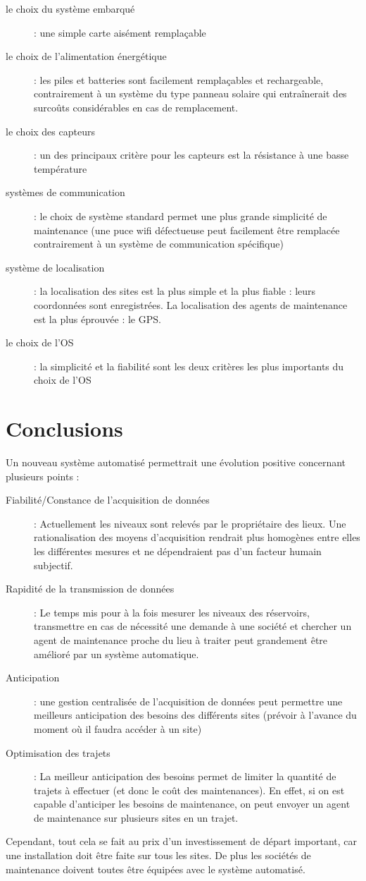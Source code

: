 \documentclass{mise_en_page}
\begin{document}
\begin{description}
\item[le choix du système embarqué] : une simple carte aisément
remplaçable
\item[le choix de l’alimentation énergétique] : les piles et batteries
sont facilement remplaçables et rechargeable, contrairement à un
système du type panneau solaire qui entraînerait des surcoûts
considérables en cas de remplacement.
\item[le choix des capteurs] : un des principaux critère pour les
capteurs est la résistance à une basse température
\item[systèmes de communication] : le choix de système standard permet
une plus grande simplicité de maintenance (une puce wifi défectueuse
peut facilement être remplacée contrairement à un système de
communication spécifique)
\item[système de localisation] : la localisation des sites est la plus
simple et la plus fiable : leurs coordonnées sont enregistrées. La
localisation des agents de maintenance est la plus éprouvée : le GPS.
\item[le choix de l’OS] : la simplicité et la fiabilité sont les deux
critères les plus importants du choix de l’OS
\end{description}

\section{Conclusions}
Un nouveau système automatisé permettrait une évolution positive
concernant plusieurs points :

\begin{description}
\item[Fiabilité/Constance de l’acquisition de données] : Actuellement les
niveaux sont relevés par le propriétaire des lieux. Une rationalisation
des moyens d’acquisition rendrait plus homogènes entre elles les
différentes mesures et ne dépendraient pas d’un facteur humain
subjectif.
\item[Rapidité de la transmission de données] : Le temps mis pour à la
fois mesurer les niveaux des réservoirs, transmettre en cas de
nécessité une demande à une société et chercher un agent de maintenance
proche du lieu à traiter peut grandement être amélioré par un système
automatique.
\item[Anticipation] : une gestion centralisée de l’acquisition de données
peut permettre une meilleurs anticipation des besoins des différents
sites (prévoir à l’avance du moment où il faudra accéder à un site)
\item[Optimisation des trajets] : La meilleur anticipation des besoins
permet de limiter la quantité de trajets à effectuer (et donc le coût
des maintenances). En effet, si on est capable d’anticiper les besoins
de maintenance, on peut envoyer un agent de maintenance sur plusieurs
sites en un trajet.
\end{description}
Cependant, tout cela se fait au prix d’un investissement de départ
important, car une installation doit être faite sur tous les sites. De
plus les sociétés de maintenance doivent toutes être équipées avec le
système automatisé.
\end{document}
